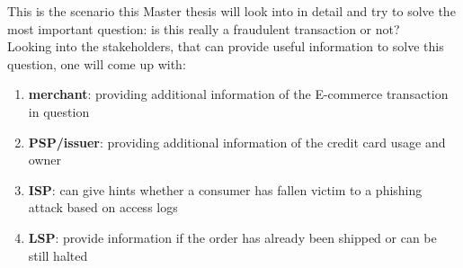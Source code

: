 This is the scenario this Master thesis will look into in detail and try to solve the most important question: is this really a fraudulent transaction or not? \\

Looking into the stakeholders, that can provide useful information to solve this question, one will come  up with:\@

\begin{enumerate}
    \item \textbf{merchant}: providing additional information of the E-commerce transaction in question
    \item \textbf{\gls{PSP}/issuer}: providing additional information of the credit card usage and owner
    \item \textbf{\gls{ISP}}: can give hints whether a consumer has fallen victim to a phishing attack based on access logs
    \item \textbf{\gls{LSP}}: provide information if the order has already been shipped or can be still halted
\end{enumerate} 

